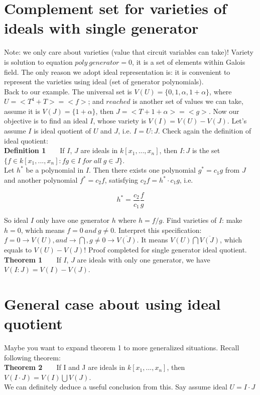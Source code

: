 \documentclass[12pt]{article}
\begin{document}
\section{Complement set for varieties of ideals with single generator}
Note: we only care about varieties (value that circuit variables can take)! 
Variety is solution to equation $poly\ generator = 0$, it is a set of elements within Galois field. 
The only reason we adopt ideal representation
is: it is convenient to represent the varieties using ideal (set of generator polynomials).\\

Back to our example. The universal set is $V(U) = \{0, 1, \alpha, 1 + \alpha\}$, 
where $U = < T^4 + T > = < f >$; and $reached$ is another set of values we can take, assume it is
$V(J) = \{1 + \alpha\}$, then $J = < T + 1 + \alpha > = < g >$. Now our objective is to find an ideal
$I$, whose variety is $V(I) = V(U) - V(J)$. Let's assume $I$ is ideal quotient of $U$ and $J$, i.e. 
$I = U:J$. Check again the definition of ideal quotient:\\

\textbf{Definition 1}\ \ \ \ If $I$, $J$ are ideals in $k[x_1,...,x_n]$, then $I:J$ is the set \\ \indent $\{f\in k[x_1,...,x_n]:fg\in I\ for \ all\ g\in J\}$.\\

Let $h^*$ be a polynomial in $I$. Then there exists one polynomial $g^* = c_1g$ from $J$ and another
polynomial $f^* = c_2f$, satisfying $c_2f = h^*\cdot c_1g$, i.e.

\[
h^* = \frac{c_2}{c_1} \frac{f}{g}
\]

So ideal $I$ only have one generator $h$ where $h = f/g$. Find varieties of $I$: make $h = 0$, which means
$f = 0\ and\ g \neq 0$. Interpret this specification: $f = 0 \to V(U), and \to \bigcap, g \neq 0 \to \overline{V(J)}$.
It means $V(U) \bigcap \overline{V(J)}$, which equals to $V(U) - V(J)$! Proof completed for single generator
ideal quotient. \\

\textbf{Theorem 1}\ \ \ \ If $I$, $J$ are ideals with only one generator, we have\\ $V(I:J) = V(I) - V(J)$.

\section{General case about using ideal quotient}
Maybe you want to expand theorem 1 to more generalized situations. Recall following theorem:\\

\textbf{Theorem 2}\ \ \ \ If I and J are ideals in $k[x_1,...,x_n]$, then $V(I \cdot J)=V(I)\bigcup V(J)$.\\

We can definitely deduce a useful conclusion from this. Say assume ideal $U = I \cdot J$ 
\end{document}
